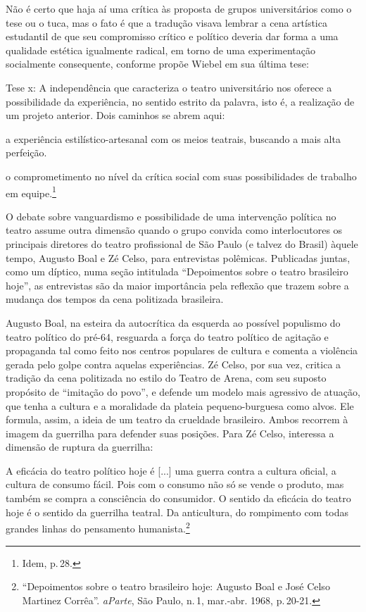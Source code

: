 Não é certo que haja aí uma crítica às proposta de grupos universitários
como o {\sc tese} ou o {\sc tuca}, mas o fato é que a tradução visava lembrar a cena
artística estudantil de que seu compromisso crítico e político deveria
dar forma a uma qualidade estética igualmente radical, em torno de uma
experimentação socialmente consequente, conforme propõe Wiebel em sua
última tese:

\startblockquote
Tese {\sc x}: A independência que caracteriza o teatro universitário
nos oferece a possibilidade da experiência, no sentido estrito da
palavra, isto é, a realização de um projeto anterior. Dois caminhos se
abrem aqui:

\startitemize[n,packed]
\item a experiência estilístico-artesanal com os meios teatrais, buscando a
mais alta perfeição.

\item o comprometimento no nível da crítica social com suas possibilidades
de trabalho em equipe.\footnote{Idem, p.\,28.}
\stopitemize
\stopblockquote

O debate sobre vanguardismo e possibilidade de uma intervenção
política no teatro assume outra dimensão quando o grupo convida como
interlocutores os principais diretores do teatro profissional de São
Paulo (e talvez do Brasil) àquele tempo, Augusto Boal e Zé Celso, para
entrevistas polêmicas. Publicadas juntas, como um díptico, numa seção
intitulada “Depoimentos sobre o teatro brasileiro hoje”, as
entrevistas são da maior importância pela reflexão que trazem sobre a
mudança dos tempos da cena politizada brasileira.

Augusto Boal, na esteira da autocrítica da esquerda ao possível
populismo do teatro político do pré-64, resguarda a força do teatro
político de agitação e propaganda tal como feito nos centros populares
de cultura e comenta a violência gerada pelo golpe contra aquelas
experiências. Zé Celso, por sua vez, critica a tradição da cena
politizada no estilo do Teatro de Arena, com seu suposto propósito de
“imitação do povo”, e defende um modelo mais agressivo de atuação, que
tenha a cultura e a moralidade da plateia pequeno-burguesa como alvos.
Ele formula, assim, a ideia de um teatro da crueldade brasileiro. Ambos
recorrem à imagem da guerrilha para defender suas posições. Para Zé
Celso, interessa a dimensão de ruptura da guerrilha:

\startblockquote
A eficácia do teatro político hoje é {[}...{]} uma guerra contra a
cultura oficial, a cultura de consumo fácil. Pois com o consumo não só
se vende o produto, mas também se compra a consciência do consumidor. O
sentido da eficácia do teatro hoje é o sentido da guerrilha teatral. Da
anticultura, do rompimento com todas grandes linhas do pensamento
humanista.\footnote{“Depoimentos sobre o teatro brasileiro hoje: Augusto
  Boal e José Celso Martinez Corrêa”. {\it aParte}, São Paulo, n.\,1,
  mar.-abr. 1968, p.\,20-21.}
\stopblockquote

